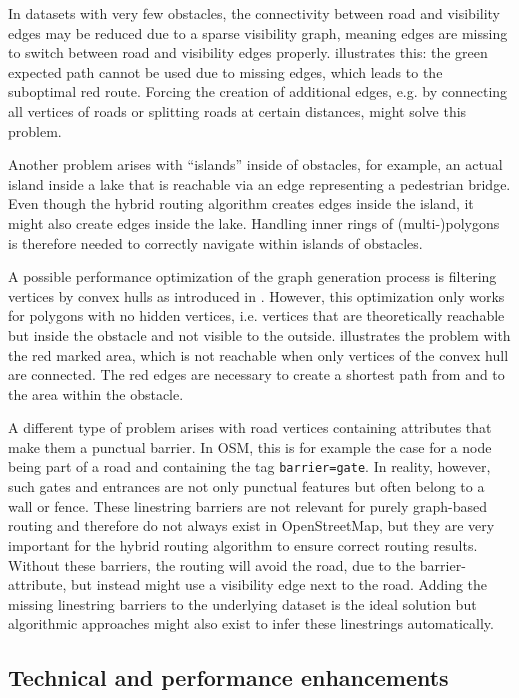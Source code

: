 		In datasets with very few obstacles, the connectivity between road and visibility edges may be reduced due to a sparse visibility graph, meaning edges are missing to switch between road and visibility edges properly.
		 illustrates this:
		the green expected path cannot be used due to missing edges, which leads to the suboptimal red route.
		Forcing the creation of additional edges, e.g. by connecting all vertices of roads or splitting roads at certain distances, might solve this problem.
		
		Another problem arises with \enquote{islands} inside of obstacles, for example, an actual island inside a lake that is reachable via an edge representing a pedestrian bridge.
		Even though the hybrid routing algorithm creates edges inside the island, it might also create edges inside the lake.
		Handling inner rings of (multi-)polygons is therefore needed to correctly navigate within islands of obstacles.
		
		A possible performance optimization of the graph generation process is filtering vertices by convex hulls as introduced in .
		However, this optimization only works for polygons with no hidden vertices, i.e. vertices that are theoretically reachable but inside the obstacle and not visible to the outside.
		 illustrates the problem with the red marked area, which is not reachable when only vertices of the convex hull are connected.
		The red edges are necessary to create a shortest path from and to the area within the obstacle.
		
		A different type of problem arises with road vertices containing attributes that make them a punctual barrier.
		In OSM, this is for example the case for a node being part of a road and containing the tag \texttt{barrier=gate}.
		In reality, however, such gates and entrances are not only punctual features but often belong to a wall or fence.
		These linestring barriers are not relevant for purely graph-based routing and therefore do not always exist in OpenStreetMap, but they are very important for the hybrid routing algorithm to ensure correct routing results.
		Without these barriers, the routing will avoid the road, due to the barrier-attribute, but instead might use a visibility edge next to the road.
		Adding the missing linestring barriers to the underlying dataset is the ideal solution but algorithmic approaches might also exist to infer these linestrings automatically.
		
	\subsection{Technical and performance enhancements}
		
